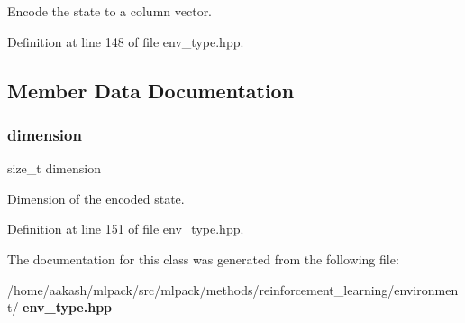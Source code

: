 Encode the state to a column vector. 



Definition at line 148 of file env\+\_\+type.\+hpp.



\subsection{Member Data Documentation}
\mbox{\label{classmlpack_1_1rl_1_1ContinuousActionEnv_1_1State_a389cd93f4e125d4369384464914be61f}} 
\subsubsection{dimension}
{\footnotesize\ttfamily size\+\_\+t dimension\hspace{0.3cm}{\ttfamily [static]}}



Dimension of the encoded state. 



Definition at line 151 of file env\+\_\+type.\+hpp.



The documentation for this class was generated from the following file\+:\begin{DoxyCompactItemize}
\item 
/home/aakash/mlpack/src/mlpack/methods/reinforcement\+\_\+learning/environment/\textbf{ env\+\_\+type.\+hpp}\end{DoxyCompactItemize}
